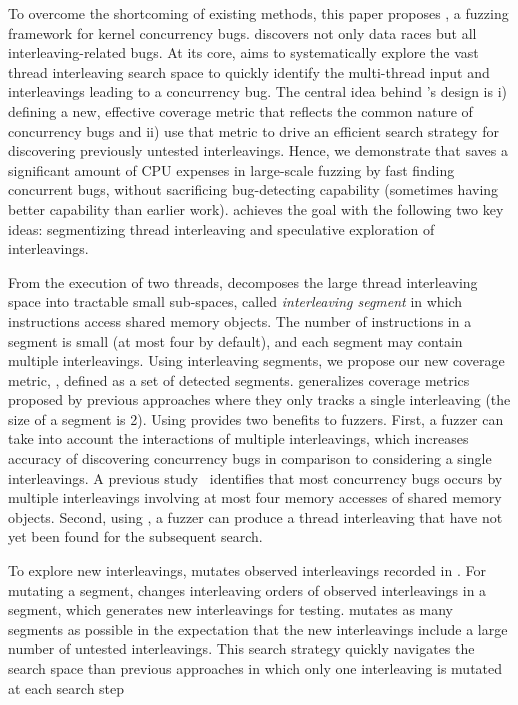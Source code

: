 To overcome the shortcoming of existing methods, this paper proposes
\sys, a fuzzing framework for kernel concurrency bugs. 
\sys discovers not only data races but 
all interleaving-related bugs. 
At its core, \sys aims to systematically explore the vast thread
interleaving search space to quickly identify the multi-thread input and 
interleavings leading to a concurrency bug. The central idea behind \sys's design
is i) defining a new, effective coverage metric that reflects the 
common nature of concurrency bugs and ii) use that metric to drive 
an efficient search strategy for discovering previously untested interleavings.
Hence, we demonstrate that \sys saves a significant amount of CPU expenses 
in large-scale fuzzing by fast finding concurrent bugs, 
without sacrificing bug-detecting capability (sometimes having better 
capability than earlier work).
\sys achieves the goal with the following two key ideas: segmentizing thread interleaving and speculative exploration  of interleavings.

 From the execution of two threads,  
\sys decomposes the large thread interleaving space into tractable 
small sub-spaces, called \textit{interleaving segment} in which
instructions access shared memory objects. The number of instructions 
in a segment is small (at most four by default), and each segment may 
contain multiple interleavings. Using interleaving segments, we propose 
our new coverage metric, \textit{\intcov}, defined as a set of detected segments. \Intcov generalizes coverage 
metrics proposed by previous approaches where they only tracks 
a single interleaving (the size of a segment is 2). 
Using \intcov provides two benefits to fuzzers. First, a fuzzer can 
take into account the interactions of multiple interleavings, which increases
accuracy of discovering concurrency bugs in comparison to considering a single 
interleavings. A previous study~\cite{learningfrommistakes} identifies that
most concurrency bugs occurs by multiple interleavings involving 
at most four memory accesses of shared memory objects.
Second, using \intcov, a fuzzer can produce a thread interleaving
that have not yet been found for the subsequent search.

  To explore new interleavings,
\sys mutates observed interleavings recorded in \intcov. For mutating a segment, \sys changes interleaving orders of observed interleavings 
in a segment, which generates new interleavings for testing. \sys 
mutates as many segments as possible in the expectation that the 
new interleavings include a large number of untested interleavings. 
This search strategy quickly navigates the search space than previous 
approaches in which only one interleaving is mutated at each search step

